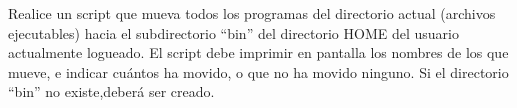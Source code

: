 \begin{questions}
\item Realice un script que mueva todos los programas del directorio actual (archivos ejecutables) hacia el subdirectorio ``bin'' del directorio HOME del usuario actualmente logueado. El script debe imprimir en pantalla los nombres de los que mueve, e indicar cuántos ha movido, o que no ha movido ninguno. Si el directorio “bin” no existe,deberá ser creado.

\end{questions}

